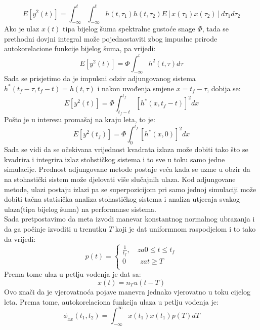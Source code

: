 \begin{equation}
    E[y^2(t)]=\int_{-\infty}^t\int_{-\infty}^th(t,\tau_1)h(t,\tau_2)E[x(\tau_1)x(\tau_2)]d\tau_1d\tau_2
\end{equation}
Ako je ulaz $x(t)$ tipa bijelog šuma spektralne gustoće snage $\Phi$, tada se prethodni 
dovjni integral može pojednostaviti zbog impuslne prirode autokorelacione funkcije 
bijelog šuma, pa vrijedi:
\begin{equation}
    E[y^2(t)]=\Phi \int_{-\infty}^t h^2(t,\tau)d\tau
\end{equation}
Sada se prisjetimo da je impulsni odziv adjungovanog sistema $h^*(t_f-\tau,t_f-t)=h(t,\tau)$
 i nakon uvođenja smjene $x=t_f-\tau$, dobija se:
\begin{equation}
    E[y^2(t)]=\Phi\int_{t_f-t}^{t_f}[h^*(x,t_f-t)]^2dx
\end{equation}
Pošto je u interesu promašaj na kraju leta, to je:
\begin{equation}
    E[y^2(t_f)]=\Phi\int_{0}^{t_f}[h^*(x,0)]^2dx
\end{equation}
Sada se vidi da se očekivana vrijednost kvadrata izlaza može dobiti tako što se 
kvadrira i integrira izlaz stohstičkog sistema i to sve u toku samo jedne simulacije. 
Prednost adjungovane metode postaje veća kada se uzme u obzir da na stohastički sistem 
može djelovati više slučajnih ulaza. Kod adjungovane metode, ulazi postaju izlazi pa se 
superpozicijom pri samo jednoj simulaciji može dobiti tačna statisička analiza stohastičkog sistema i 
analiza utjecaja svakog ulaza(tipa bijelog šuma) na performanse sistema. \\
Sada pretpostavimo da meta izvodi manevar konstantnog normalnog ubrazanja i da ga 
počinje izvoditi u trenutku $T$ koji je dat uniformnom raspodjelom i to tako da vrijedi:
\begin{equation}
    p(t)=
    \begin{cases}
        \frac{1}{t_f}, \quad za 0\leq t\leq t_f\\
        0 \qquad za t\geq T\\
    \end{cases}
\end{equation}
Prema tome ulaz u petlju vođenja je dat sa:
\begin{equation}
    x(t)=n_Tu(t-T)
\end{equation}
Ovo znači da je vjerovatnoća pojave manevra jednako vjerovatno u toku cijelog leta. 
Prema tome, autokorelaciona funkcija ulaza u petlju vođenja je:
\begin{equation}
    \phi_{xx}(t_1,t_2)=\int_{-\infty}^{\infty}x(t_1)x(t_1)p(T)dT
\end{equation}
